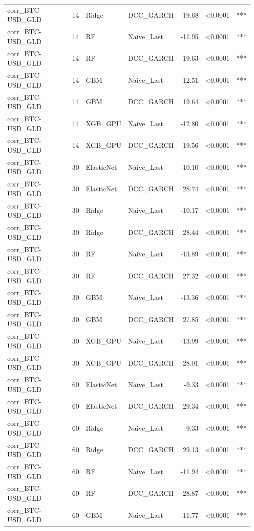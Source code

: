 \begin{table}[H]
\begin{tabular}{llllrrl}
corr_BTC-USD_GLD & 14 & Ridge & DCC_GARCH & 19.68 & <0.0001 & *** \\
corr_BTC-USD_GLD & 14 & RF & Naive_Last & -11.95 & <0.0001 & *** \\
corr_BTC-USD_GLD & 14 & RF & DCC_GARCH & 19.63 & <0.0001 & *** \\
corr_BTC-USD_GLD & 14 & GBM & Naive_Last & -12.51 & <0.0001 & *** \\
corr_BTC-USD_GLD & 14 & GBM & DCC_GARCH & 19.64 & <0.0001 & *** \\
corr_BTC-USD_GLD & 14 & XGB_GPU & Naive_Last & -12.80 & <0.0001 & *** \\
corr_BTC-USD_GLD & 14 & XGB_GPU & DCC_GARCH & 19.56 & <0.0001 & *** \\
corr_BTC-USD_GLD & 30 & ElasticNet & Naive_Last & -10.10 & <0.0001 & *** \\
corr_BTC-USD_GLD & 30 & ElasticNet & DCC_GARCH & 28.74 & <0.0001 & *** \\
corr_BTC-USD_GLD & 30 & Ridge & Naive_Last & -10.17 & <0.0001 & *** \\
corr_BTC-USD_GLD & 30 & Ridge & DCC_GARCH & 28.44 & <0.0001 & *** \\
corr_BTC-USD_GLD & 30 & RF & Naive_Last & -13.89 & <0.0001 & *** \\
corr_BTC-USD_GLD & 30 & RF & DCC_GARCH & 27.32 & <0.0001 & *** \\
corr_BTC-USD_GLD & 30 & GBM & Naive_Last & -13.36 & <0.0001 & *** \\
corr_BTC-USD_GLD & 30 & GBM & DCC_GARCH & 27.85 & <0.0001 & *** \\
corr_BTC-USD_GLD & 30 & XGB_GPU & Naive_Last & -13.99 & <0.0001 & *** \\
corr_BTC-USD_GLD & 30 & XGB_GPU & DCC_GARCH & 28.01 & <0.0001 & *** \\
corr_BTC-USD_GLD & 60 & ElasticNet & Naive_Last & -9.33 & <0.0001 & *** \\
corr_BTC-USD_GLD & 60 & ElasticNet & DCC_GARCH & 29.34 & <0.0001 & *** \\
corr_BTC-USD_GLD & 60 & Ridge & Naive_Last & -9.33 & <0.0001 & *** \\
corr_BTC-USD_GLD & 60 & Ridge & DCC_GARCH & 29.13 & <0.0001 & *** \\
corr_BTC-USD_GLD & 60 & RF & Naive_Last & -11.94 & <0.0001 & *** \\
corr_BTC-USD_GLD & 60 & RF & DCC_GARCH & 28.87 & <0.0001 & *** \\
corr_BTC-USD_GLD & 60 & GBM & Naive_Last & -11.77 & <0.0001 & *** \\

\end{tabular}
\end{table}
